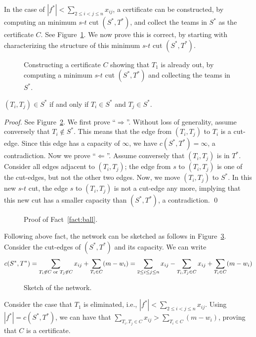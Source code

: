 In the case of $|f^*| < \sum_{2\le i< j \le n} x_{ij}$,
a certificate can be constructed, by computing an minimum $s$-$t$ cut $(S^*, T^*)$,
and collect the teams in $S^*$ as the certificate $C$.
See Figure~\ref{fig:certificate}.
We now prove this is correct, by starting with characterizing
the structure of this minimum $s$-$t$ cut $(S^*,T^*)$.

\begin{figure}[!h]
\centering{}
\caption{Constructing a certificate $C$ showing that $T_1$ is already out,
	by computing a minimum $s$-$t$ cut $(S^*,T^*)$ and collecting the teams in $S^*$.}
\label{fig:certificate}
\end{figure}



\begin{fact}
$(T_i,T_j) \in S^*$ if and only if $T_i\in S^*$ and $T_j\in S^*$.
\label{fact:ball}
\end{fact}
\emph{Proof.} 
See Figure~\ref{fig:ballproof}.
We first prove ``$\Longrightarrow$''.
Without loss of generality, assume conversely that $T_i \not\in S^*$.
This means that the edge from $(T_i,T_j)$ to $T_i$ is a cut-edge.
Since this edge has a capacity of $\infty$, we have $c(S^*,T^*) = \infty$, a contradiction.
Now we prove ``$\Longleftarrow$''. 
Assume conversely that $(T_i, T_j)$ is in $T^*$.
Consider all edges adjacent to $(T_i, T_j)$;
the edge from $s$ to $(T_i,T_j)$ is one of the cut-edges, but not the other two edges.
Now, we move $(T_i,T_j)$ to $S^*$.
In this new $s$-$t$ cut, the edge $s$ to $(T_i,T_j)$ is not a cut-edge any more,
implying that this new cut has a smaller capacity than $(S^*,T^*)$, a contradiction.  \qed

\begin{figure}[!h]
\centering{}
\caption{Proof of Fact~\ref{fact:ball}.}
\label{fig:ballproof}
\end{figure}


Following above fact, the network can be sketched as follows in Figure~\ref{fig:ballsketch}.
Consider the cut-edges of $(S^*,T^*)$ and its capacity.
We can write
$$c(S^*,T^*) = \sum_{T_i \not\in C \textrm{ or } T_j \not\in C} x_{ij} + \sum_{T_i\in C} (m-w_i) \\
= \sum_{2\le i \le j \le n} x_{ij} - \sum_{T_i,T_j \in C} x_{ij} + \sum_{T_i\in C} (m-w_i) $$


\begin{figure}[!h]
\centering{}
\caption{Sketch of the network.}
\label{fig:ballsketch}
\end{figure}


Consider the case that $T_1$ is eliminated, i.e., $|f^*| < \sum_{2\le i< j \le n} x_{ij}$. 
Using $|f^*| = c(S^*,T^*)$, we can have that
$\sum_{T_i,T_j \in C} x_{ij} > \sum_{T_i\in C} (m-w_i)$, proving that $C$ is a certificate.

